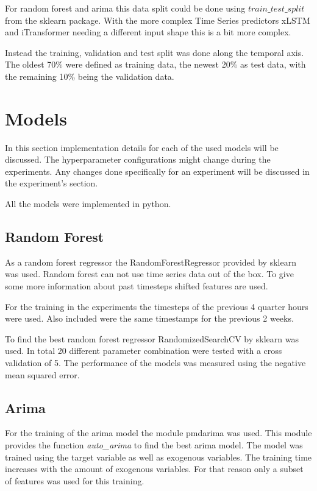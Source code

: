 \documentclass[class=scrbook, crop=false]{standalone}
\begin{document}
For random forest and arima this data split could be done using $train\_test\_split$ from the sklearn package. 
With the more complex Time Series predictors xLSTM and iTransformer needing a different input shape this is a bit more complex.

Instead the training, validation and test split was done along the temporal axis. 
The oldest 70\% were defined as training data, the newest 20\% as test data, with the remaining 10\% being the validation data.


\section{Models}
\label{Section::Models}

In this section implementation details for each of the used models will be discussed. 
The hyperparameter configurations might change during the experiments. 
Any changes done specifically for an experiment will be discussed in the experiment's section.

All the models were implemented in python. 

\subsection{Random Forest}
\label{Section::Random_Forest}

As a random forest regressor the RandomForestRegressor provided by sklearn was used.
Random forest can not use time series data out of the box.
To give some more information about past timesteps shifted features are used.

For the training in the experiments the timesteps of the previous 4 quarter hours were used.
Also included were the same timestamps for the previous 2 weeks.

To find the best random forest regressor RandomizedSearchCV by sklearn was used.
In total 20 different parameter combination were tested with a cross validation of 5.
The performance of the models was measured using the negative mean squared error.

\subsection{Arima}
\label{Section::Arima}

For the training of the arima model the module pmdarima was used.
This module provides the function \textit{auto\_arima} to find the best arima model.
The model was trained using the target variable as well as exogenous variables.
The training time increases with the amount of exogenous variables.
For that reason only a subset of features was used for this training.
\end{document}

